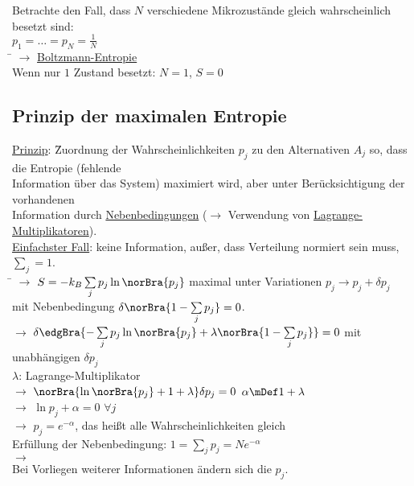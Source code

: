 \begin{tabbing}
Betrachte den Fall, dass $N$ verschiedene Mikrozustände gleich wahrscheinlich besetzt sind:\\ $p_1=\dots =p_N = \frac{1}{N}$\\
\hspace{4em} \= \kill
$\rightarrow$\>  \uline{Boltzmann-Entropie}\\
Wenn nur $1$ Zustand besetzt: $N=1$, $S=0$
\end{tabbing}


\subsection{Prinzip der maximalen Entropie}
\begin{tabbing}
\uline{Prinzip}: \= Zuordnung der Wahrscheinlichkeiten $p_j$ zu den Alternativen $A_j$ so, dass die Entropie (fehlende\\\> Information über das System) maximiert wird, aber unter Berücksichtigung der vorhandenen\\\> Information durch \uline{Nebenbedingungen} ($\rightarrow$ Verwendung von \uline{Lagrange-Multiplikatoren}).\\
\uline{Einfachster Fall}: keine Information, außer, dass Verteilung normiert sein muss, $\sum\limits_j = 1$.\\
\hspace{4em} \= \kill
$\rightarrow$\> $S = -k_B \sum\limits_j p_j \ln\norBra{p_j}$ maximal unter Variationen $p_j \to p_j + \delta p_j$\\\>mit Nebenbedingung $\delta \norBra{1-\sum\limits_j p_j} = 0$.\\
$\rightarrow$\> $\delta\edgBra{-\sum\limits_j p_j \ln\norBra{p_j} + \lambda\norBra{1-\sum\limits_j p_j}} = 0$ mit unabhängigen $\delta p_j$\\
\>$\lambda$: Lagrange-Multiplikator\\
$\rightarrow$\> $\norBra{\ln\norBra{p_j}+1+\lambda}\delta p_j = 0$ $\alpha \mDef 1 + \lambda$\\
$\rightarrow$\> $\ln p_j + \alpha = 0$ $\forall j$\\
$\rightarrow$\> $p_j = e^{-\alpha}$, das heißt alle Wahrscheinlichkeiten gleich\\
Erfüllung der Nebenbedingung: $1=\sum\limits_j p_j = N e^{-\alpha}$\\
$\rightarrow$\> \\
Bei Vorliegen weiterer Informationen ändern sich die $p_j$.
\end{tabbing}


